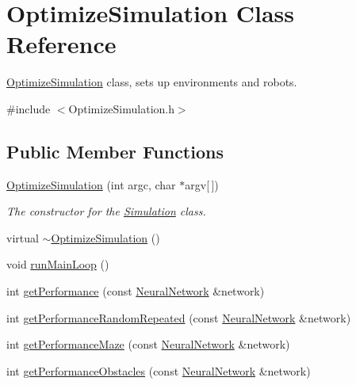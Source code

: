 \hypertarget{classOptimizeSimulation}{\section{Optimize\-Simulation Class Reference}
\label{classOptimizeSimulation}
}


\hyperlink{classOptimizeSimulation}{Optimize\-Simulation} class, sets up environments and robots.  




{\ttfamily \#include $<$Optimize\-Simulation.\-h$>$}

\subsection*{Public Member Functions}
\begin{DoxyCompactItemize}
\item 
\hyperlink{classOptimizeSimulation_a24503060026d2f4bb2224e6ba3f554a5}{Optimize\-Simulation} (int argc, char $\ast$argv\mbox{[}$\,$\mbox{]})
\begin{DoxyCompactList}\small\item\em The constructor for the \hyperlink{classSimulation}{Simulation} class. \end{DoxyCompactList}\item 
virtual \hyperlink{classOptimizeSimulation_a4c097b55978ea713789ea1f4b97630e1}{$\sim$\-Optimize\-Simulation} ()
\item 
void \hyperlink{classOptimizeSimulation_a51f48566cb982a61daa877d213c528b0}{run\-Main\-Loop} ()
\item 
int \hyperlink{classOptimizeSimulation_af14f1d43b9c80f3a3121bd62a133ce28}{get\-Performance} (const \hyperlink{classNeuralNetwork}{Neural\-Network} \&network)
\item 
int \hyperlink{classOptimizeSimulation_ace9c1e57f259d3e69aa1fbd8d971985c}{get\-Performance\-Random\-Repeated} (const \hyperlink{classNeuralNetwork}{Neural\-Network} \&network)
\item 
int \hyperlink{classOptimizeSimulation_ab2d721222b5dc4a2831d70af136409e7}{get\-Performance\-Maze} (const \hyperlink{classNeuralNetwork}{Neural\-Network} \&network)
\item 
int \hyperlink{classOptimizeSimulation_a27f0912295edf0a54e4251bb17291bba}{get\-Performance\-Obstacles} (const \hyperlink{classNeuralNetwork}{Neural\-Network} \&network)
\end{DoxyCompactItemize}


